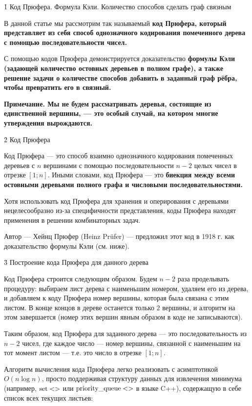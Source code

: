 \h1{ Код Прюфера. Формула Кэли. Количество способов сделать граф связным }

В данной статье мы рассмотрим так называемый \bf{код Прюфера}, который представляет из себя способ однозначного кодирования помеченного дерева с помощью последовательности чисел.

С помощью кодов Прюфера демонстрируется доказательство \bf{формулы Кэли} (задающей количество остовных деревьев в полном графе), а также решение задачи о количестве способов добавить в заданный граф рёбра, чтобы превратить его в связный.

\bf{Примечание}. Мы не будем рассматривать деревья, состоящие из единственной вершины, --- это особый случай, на котором многие утверждения вырождаются.



\h2{ Код Прюфера }

Код Прюфера --- это способ взаимно однозначного кодирования помеченных деревьев с $n$ вершинами с помощью последовательности $n-2$ целых чисел в отрезке $[1;n]$. Иными словами, код Прюфера --- это \bf{биекция} между всеми остовными деревьями полного графа и числовыми последовательностями.

Хотя использовать код Прюфера для хранения и оперирования с деревьями нецелесообразно из-за специфичности представления, коды Прюфера находят применения в решении комбинаторных задач.

Автор --- Хейнц Прюфер (Heinz Prüfer) --- предложил этот код в 1918 г. как доказательство формулы Кэли (см. ниже).


\h3{ Построение кода Прюфера для данного дерева }

Код Прюфера строится следующим образом. Будем $n-2$ раза проделывать процедуру: выбираем лист дерева с наименьшим номером, удаляем его из дерева, и добавляем к коду Прюфера номер вершины, которая была связана с этим листом. В конце концов в дереве останется только $2$ вершины, и алгоритм на этом завершается (номер этих вершин явным образом в коде не записываются).

Таким образом, код Прюфера для заданного дерева --- это последовательность из $n-2$ чисел, где каждое число --- номер вершины, связанной с наименьшим на тот момент листом --- т.е. это число в отрезке $[1;n]$.

Алгоритм вычисления кода Прюфера легко реализовать с асимптотикой $O (n \log n)$, просто поддерживая структуру данных для извлечения минимума (например, $\rm set<>$ или $\rm priority\_queue<>$ в языке C++), содержащую в себе список всех текущих листьев:

